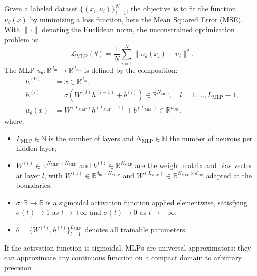 Given a labeled dataset ${\{(x_i, u_i)\}}_{i=1}^{N}$, the objective is to fit the function $u_{\theta}(x)$ by minimizing a loss function, here the Mean Squared Error (MSE). With $\|\cdot\|$ denoting the Euclidean norm, the unconstrained optimization problem is:
\begin{equation}
    \mathcal{L}_{\text{MLP}}(\theta) = \frac{1}{N} \sum_{i=1}^{N} \| u_{\theta}(x_i) - u_i \|^2. \label{eq:data_loss_nn}
\end{equation}
The MLP $u_\theta: \mathbb{R}^{d_{\mathrm{in}}} \to \mathbb{R}^{d_{\mathrm{out}}}$ is defined by the composition:
\begin{align}
    h^{(0)}       &= x \in \mathbb{R}^{d_{\mathrm{in}}}, \label{eq:input}                                                                 \\
    h^{(l)}       &= \sigma \left( W^{(l)} h^{(l-1)} + b^{(l)} \right) \in \mathbb{R}^{N_{\mathrm{MLP}}},
                   \quad l = 1, \dots, L_{\mathrm{MLP}}-1, \label{eq:hidden} \\
    u_{\theta}(x) &= W^{(L_{\mathrm{MLP}})} h^{(L_{\mathrm{MLP}}-1)} + b^{(L_{\mathrm{MLP}})} \in \mathbb{R}^{d_{\mathrm{out}}}. \label{eq:output}
\end{align}
\noindent where:
\begin{itemize}
    \item $L_{\mathrm{MLP}} \in \mathbb{N}$ is the number of layers and $N_{\mathrm{MLP}} \in \mathbb{N}$ the number of neurons per hidden layer;
    \item $W^{(l)} \in \mathbb{R}^{N_{\mathrm{MLP}} \times N_{\mathrm{MLP}}}$ and $b^{(l)} \in \mathbb{R}^{N_{\mathrm{MLP}}}$ are the weight matrix and bias vector at layer $l$, with $W^{(1)} \in \mathbb{R}^{d_{\mathrm{in}} \times N_{\mathrm{MLP}}}$ and $W^{(L_{\mathrm{MLP}})} \in \mathbb{R}^{N_{\mathrm{MLP}} \times d_{\mathrm{out}}}$ adapted at the boundaries;
    \item $\sigma : \mathbb{R} \to \mathbb{R}$ is a sigmoidal activation function applied elementwise, satisfying $\sigma(t) \to 1$ as $t \to +\infty$ and $\sigma(t) \to 0$ as $t \to -\infty$;
    \item $\theta = \{W^{(l)}, b^{(l)}\}_{l=1}^{L_{\mathrm{MLP}}}$ denotes all trainable parameters.
\end{itemize}

If the activation function is sigmoidal, MLPs are universal approximators: they can approximate any continuous function on a compact domain to arbitrary precision \parencite{cybenko1989}.

